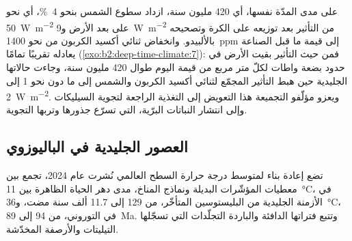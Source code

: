 \begin{omfigure}
\par{}
\end{omfigure}

على مدى المدّة نفسها، أي 420 مليون سنة، ازداد سطوع الشمس بنحو \qty{4}{\percent}، أي نحو
\qty{50}{W.m^{-2}} على بعد الأرض و\qty{9}{W.m^{-2}} من التأثير بعد توزيعه على
الكرة وتصحيحه بالألبيدو. وانخفاض ثنائي أكسيد الكربون من نحو \qty{1400}{ppm} إلى
قيمة ما قبل الصناعة يعادله تقريبًا تمامًا (\cref{exo:b2:deep-time-climate:7}): فمن حيث
التأثير بقيت الأرض في حدود بضعة واطات لكلّ متر مربع من قيمة اليوم طوال 420 مليون سنة،
وجاءت حالاتها الجليدية حين هبط التأثير المجمّع لثنائي أكسيد الكربون والشمس إلى ما دون نحو 1
إلى \qty{2}{W.m^{-2}}. ويعزو مؤلّفو التجميعة هذا التعويض إلى التغذية الراجعة لتجوية
السيليكات وإلى انتشار النباتات البرّية، التي تسرّع جذورها وتربها التجوية.

\subsection*{العصور الجليدية في الباليوزوي}

تضع إعادة بناء لمتوسط درجة حرارة السطح العالمي نُشرت عام 2024، تجمع بين معطيات المؤشّرات البديلة
ونماذج المناخ، مدى دهر الحياة الظاهرة بين \qty{11}{\celsius}، في الأزمنة الجليدية من
البليستوسين المتأخّر، من 129 إلى 11.7 ألف سنة مضت، و\qty{36}{\celsius}، في التوروني، من 94 إلى \qty{89}{Ma}.
وتتبع فتراتها الدافئة والباردة التجلّدات التي تسجّلها التيليتات والأرصفة المخدّشة.

